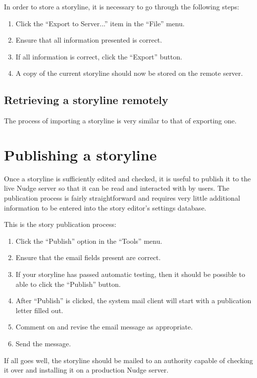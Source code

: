 \documentclass[12pt,letterpaper]{article}
\begin{document}
In order to store a storyline, it is necessary to go through the following steps:
\begin{enumerate}
\item Click the ``Export to Server...'' item in the ``File'' menu. 
\item Ensure that all information presented is correct.
\item If all information is correct, click the ``Export'' button.
\item A copy of the current storyline should now be stored on the remote server.
\end{enumerate}

\subsection{Retrieving a storyline remotely}
The process of importing a storyline is very similar to that of exporting one. 

\section{Publishing a storyline}
Once a storyline is sufficiently edited and checked, it is useful to publish it to the live Nudge server so that it can be
read and interacted with by users. The publication process is fairly straightforward and requires very little additional information
to be entered into the story editor's settings database. 

This is the story publication process:
\begin{enumerate}
\item Click the ``Publish'' option in the ``Tools'' menu.
\item Ensure that the email fields present are correct.
\item If your storyline has passed automatic testing, then it should be possible to able to click the ``Publish'' button.
\item After ``Publish'' is clicked, the system mail client will start with a publication letter filled out.
\item Comment on and revise the email message as appropriate.
\item Send the message.
\end{enumerate}

If all goes well, the storyline should be mailed to an authority capable of checking it over and installing it on a
production Nudge server. 
\end{document}
